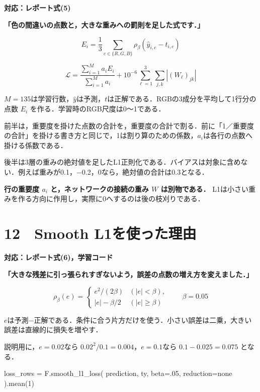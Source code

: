 \documentclass[
  14pt,
  a5paper,
]{extarticle}
\newenvironment{Shaded}{}{}
\newcommand{\DecValTok}[1]{\textcolor[rgb]{0.25,0.63,0.44}{#1}}
\newcommand{\FloatTok}[1]{\textcolor[rgb]{0.25,0.63,0.44}{#1}}
\newcommand{\NormalTok}[1]{#1}
\newcommand{\OperatorTok}[1]{\textcolor[rgb]{0.40,0.40,0.40}{#1}}
\newcommand{\StringTok}[1]{\textcolor[rgb]{0.25,0.44,0.63}{#1}}
\begin{document}
\textbf{対応：レポート式(5)}

\textbf{「色の間違いの点数と，大きな重みへの罰則を足した式です．」}

\[E_i=\frac13\sum_{c\in\{R,G,B\}}
\rho_\beta(\widehat y_{i,c}-t_{i,c})\]

\[\mathcal L=
\frac{\sum_{i=1}^{M}a_iE_i}{\sum_{i=1}^{M}a_i}
+10^{-6}\sum_{\ell=1}^{3}\sum_{j,k}|(W_\ell)_{jk}|\]

\(M=135\)は学習行数，\(\widehat y\)は予測，\(t\)は正解である．RGBの3成分を平均して1行分の点数
\(E_i\) を作る．学習時のRGB尺度は0〜1である．

前半は，重要度を掛けた点数の合計を，重要度の合計で割る．前に「1／重要度の合計」を掛ける書き方と同じで，1は割り算のための係数，\(a_i\)は各行の点数へ掛ける係数である．

後半は3層の重みの絶対値を足したL1正則化である．バイアスは対象に含めない．例えば重みが0.1，−0.2，0なら，絶対値の合計は0.3となる．

\textbf{行の重要度 \(a_i\) と，ネットワークの接続の重み \(W\)
は別物である．}
L1は小さい重みを作る方向に作用し，実際に0へするのは後の枝刈りである．

\newpage

\section{12　Smooth
L1を使った理由}\label{smooth-l1ux3092ux4f7fux3063ux305fux7406ux7531}

\textbf{対応：レポート式(6)，学習コード}

\textbf{「大きな残差に引っ張られすぎないよう，誤差の点数の増え方を変えました．」}

\[\rho_\beta(e)=
\begin{cases}
e^2/(2\beta)&(|e|<\beta),\\
|e|-\beta/2&(|e|\geq\beta)
\end{cases}
\qquad\beta=0.05\]

\(e\)は予測−正解である．条件に合う片方だけを使う．小さい誤差は二乗，大きい誤差は直線的に損失を増やす．

説明用に，\(e=0.02\)なら \(0.02^2/0.1=0.004\)，\(e=0.1\)なら
\(0.1-0.025=0.075\) となる．

\begin{Shaded}
\begin{Highlighting}[]
\NormalTok{loss\_rows }\OperatorTok{=}\NormalTok{ F.smooth\_l1\_loss(}
\NormalTok{    prediction, ty,}
\NormalTok{    beta}\OperatorTok{=}\FloatTok{.05}\NormalTok{, reduction}\OperatorTok{=}\StringTok{\textquotesingle{}none\textquotesingle{}}
\NormalTok{).mean(}\DecValTok{1}\NormalTok{)}
\end{Highlighting}
\end{Shaded}
\end{document}
